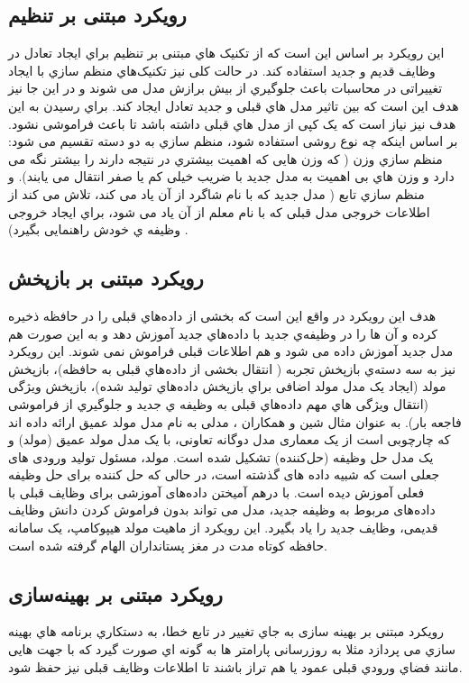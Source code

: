 \subsection{رویکرد مبتنی بر تنظیم}
این رویکرد بر اساس این است که از تکنیک هاي مبتنی بر تنظیم
براي ایجاد تعادل در وظایف قدیم و جدید استفاده کند. در حالت کلی نیز تکنیک‌هاي منظم سازي با ایجاد تغییراتی در محاسبات باعث جلوگیري از بیش برازش مدل می شوند و در این جا نیز هدف این است که بین تاثیر مدل هاي قبلی و جدید تعادل ایجاد کند. براي رسیدن به این هدف نیز نیاز است که یک کپی از مدل هاي قبلی داشته باشد تا باعث فراموشی نشود. بر اساس اینکه چه نوع روشی استفاده شود، منظم سازي به دو دسته تقسیم می شود: منظم سازي وزن ( که وزن هایی که اهمیت بیشتري در نتیجه دارند را بیشتر نگه می دارد و وزن هاي بی اهمیت به مدل جدید با ضریب خیلی کم یا صفر انتقال می یابند). و منظم سازي تابع ( مدل جدید که با نام شاگرد از آن یاد می کند، تلاش می کند از اطلاعات خروجی مدل قبلی که با نام معلم از آن یاد می شود، براي ایجاد خروجی وظیفه ي خودش راهنمایی بگیرد) 
\cite{7,8}.
\subsection{رویکرد مبتنی بر بازپخش}
هدف این رویکرد در واقع این است که بخشی از داده‌هاي قبلی را در حافظه ذخیره کرده و آن ها را در وظیفه‌ي جدید با داده‌هاي جدید آموزش دهد و به این صورت هم مدل جدید آموزش داده می شود و هم اطلاعات قبلی فراموش نمی شوند. این رویکرد نیز به سه دسته‌ي بازپخش تجربه 
( انتقال بخشی از داده‌هاي قبلی به حافظه)، بازپخش مولد 
(ایجاد یک مدل مولد اضافی براي بازپخش داده‌هاي تولید شده)، بازپخش ویژگی 
(انتقال ویژگی هاي مهم داده‌هاي قبلی به وظیفه ي جدید و جلوگیري از فراموشی فاجعه بار). به عنوان مثال شین و همکاران 
\cite{9}
، مدلی به نام مدل مولد عمیق ارائه داده اند که چارچوبی است از یک معماری مدل دوگانه تعاونی، با یک مدل مولد عمیق (مولد) و یک مدل حل وظیفه (حل‌کننده) تشکیل شده است. مولد، مسئول تولید ورودی های جعلی است که شبیه داده های گذشته است، در حالی که حل کننده برای حل وظیفه فعلی آموزش دیده است.  با درهم آمیختن داده‌های آموزشی برای وظایف قبلی با داده‌های مربوط به وظیفه جدید، مدل می تواند بدون فراموش کردن دانش وظایف قدیمی، وظایف جدید را یاد بگیرد. این رویکرد از ماهیت مولد هیپوکامپ، یک سامانه حافظه کوتاه مدت در مغز پستانداران الهام گرفته شده است. 
\subsection{رویکرد مبتنی بر بهینه‌سازی}
رویکرد مبتنی بر بهینه سازی 
به جاي تغییر در تابع خطا، به دستکاري برنامه هاي بهینه سازي می پردازد مثلا به روزرسانی پارامتر ها به گونه اي صورت گیرد که با جهت هایی مانند فضاي ورودي قبلی عمود یا هم تراز باشند تا اطلاعات وظایف قبلی نیز حفظ شود. 
